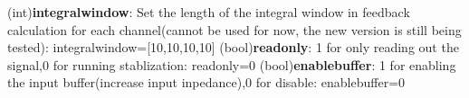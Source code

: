 \documentclass{article}
\begin{document}
(int)\textbf{integralwindow}: Set the length of the integral window in feedback calculation for each channel(cannot be used for now, the new version is still being tested):\newline
integralwindow=[10,10,10,10]\newline\newline
(bool)\textbf{readonly}: 1 for only reading out the signal,0 for running stablization:\newline
readonly=0\newline\newline
(bool)\textbf{enablebuffer}: 1 for enabling the input buffer(increase input inpedance),0 for disable:\newline
enablebuffer=0\newline\newline
\end{document}
